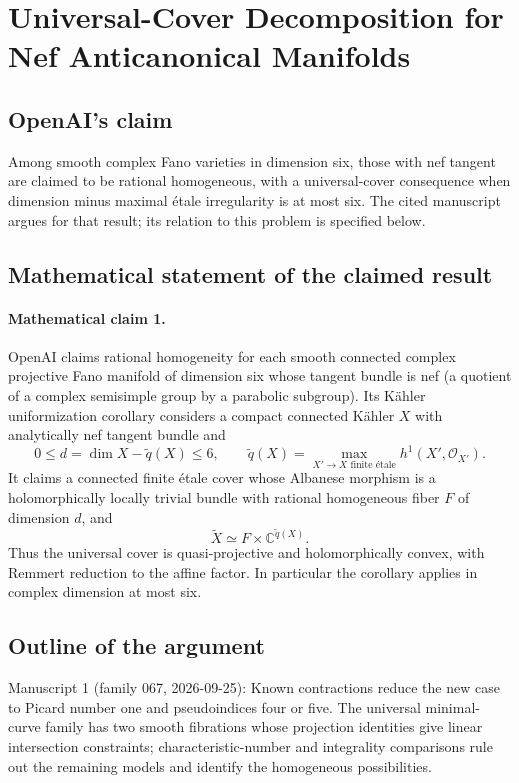\documentclass[11pt]{article}
\begin{document}
\section*{Universal-Cover Decomposition for Nef Anticanonical Manifolds}

\subsection{OpenAI's claim}
Among smooth complex Fano varieties in dimension six, those with nef tangent are claimed to be rational homogeneous, with a universal-cover consequence when dimension minus maximal étale irregularity is at most six. The cited manuscript argues for that result; its relation to this problem is specified below.

\subsection{Mathematical statement of the claimed result}
\paragraph{Mathematical claim 1.} OpenAI claims rational homogeneity for each smooth connected complex projective Fano manifold of dimension six whose tangent bundle is nef (a quotient of a complex semisimple group by a parabolic subgroup).
Its Kähler uniformization corollary considers a compact connected Kähler $X$ with analytically nef tangent bundle and
\[
0\le d=\dim X-\widetilde q(X)\le6,\qquad
\widetilde q(X)=\max_{X'\to X\text{ finite étale}}h^1(X',\mathcal O_{X'}).
\]
It claims a connected finite étale cover whose Albanese morphism is a holomorphically locally trivial bundle with rational homogeneous fiber $F$ of dimension $d$, and
\[
\widetilde X\simeq F\times\mathbb C^{\widetilde q(X)}.
\]
Thus the universal cover is quasi-projective and holomorphically convex, with Remmert reduction to the affine factor. In particular the corollary applies in complex dimension at most six.

\subsection{Outline of the argument}
Manuscript 1 (family 067, 2026-09-25): Known contractions reduce the new case to Picard number one and pseudoindices four or five. The universal minimal-curve family has two smooth fibrations whose projection identities give linear intersection constraints; characteristic-number and integrality comparisons rule out the remaining models and identify the homogeneous possibilities.
\end{document}

